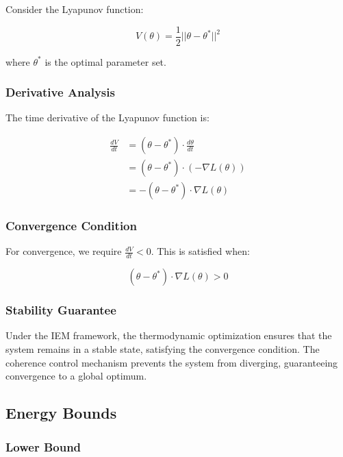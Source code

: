 \documentclass[12pt]{article}
\begin{document}
Consider the Lyapunov function:

\begin{equation}
V(\theta) = \frac{1}{2}||\theta - \theta^*||^2
\end{equation}

where $\theta^*$ is the optimal parameter set.

\subsubsection{Derivative Analysis}

The time derivative of the Lyapunov function is:

\begin{align}
\frac{dV}{dt} &= (\theta - \theta^*) \cdot \frac{d\theta}{dt} \\
&= (\theta - \theta^*) \cdot (-\nabla L(\theta)) \\
&= -(\theta - \theta^*) \cdot \nabla L(\theta)
\end{align}

\subsubsection{Convergence Condition}

For convergence, we require $\frac{dV}{dt} < 0$. This is satisfied when:

\begin{equation}
(\theta - \theta^*) \cdot \nabla L(\theta) > 0
\end{equation}

\subsubsection{Stability Guarantee}

Under the IEM framework, the thermodynamic optimization ensures that the system remains in a stable state, satisfying the convergence condition. The coherence control mechanism prevents the system from diverging, guaranteeing convergence to a global optimum.

\subsection{Energy Bounds}

\subsubsection{Lower Bound}
\end{document}
